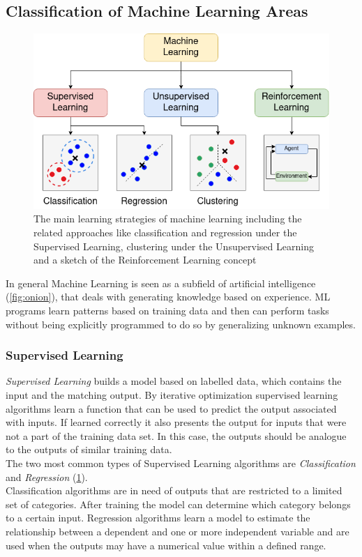 \newpage

\subsection{Classification of Machine Learning Areas}
\begin{figure}
	\centering
	\includegraphics[width=\linewidth]{figures/mlpng.png}
	\caption{The main learning strategies of machine learning including the related approaches like classification and regression under the Supervised Learning, clustering under the Unsupervised Learning and a sketch of the Reinforcement Learning concept}
	\label{fig:ml}
\end{figure}
In general Machine Learning is seen as a subfield of artificial intelligence (\cref{fig:onion}), 
that deals with generating knowledge based on experience. 
ML programs learn patterns based on training data and then can perform tasks without being explicitly programmed to do so by generalizing unknown examples. 
\subsubsection{Supervised Learning}
\emph{Supervised Learning} builds a model based on labelled data, which contains the input and the matching output.
By iterative optimization supervised learning algorithms learn a function that can be used to predict the output associated with inputs. 
If learned correctly it also presents the output for inputs that were not a part of the training data set. 
In this case, the outputs should be analogue to the outputs of similar training data.\\
The two most common types of Supervised Learning algorithms are \emph{Classification} and \emph{Regression} (\cref{fig:ml}).\\
Classification algorithms are in need of outputs that are restricted to a limited set of categories. 
After training the model can determine which category belongs to a certain input.
Regression algorithms learn a model to estimate the relationship between a dependent and one or more independent variable 
and are used when the outputs may have a numerical value within a defined range.\\

